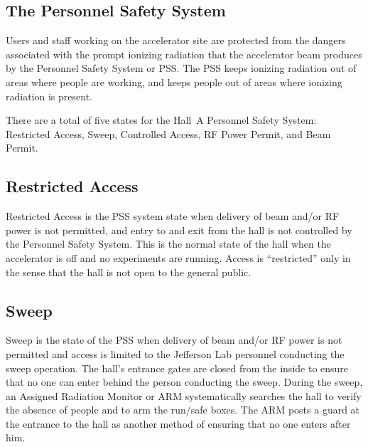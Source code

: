 \begin{safetyen}{10}{15}
\section{The Personnel Safety System} 
\end{safetyen}

 Users and staff working on the accelerator site are protected from
 the dangers associated with the prompt ionizing radiation that the
 accelerator beam produces by the Personnel Safety System or PSS.  The
 PSS keeps ionizing radiation out of areas where people are working,
 and keeps people out of areas where ionizing radiation is present.

 There are a total of five states for the Hall~A Personnel Safety
 System: Restricted Access, Sweep, Controlled Access, RF Power Permit,
 and Beam Permit.

\begin{safetyen}{10}{10}
\subsection{Restricted Access}
\end{safetyen}
 
 Restricted Access is the PSS system state when delivery of beam
 and/or RF power is not permitted, and entry to and exit from the hall
 is not controlled by the Personnel Safety System.  This is the normal
 state of the hall when the accelerator is off and no experiments are
 running.  Access is ``restricted'' only in the sense that the hall is
 not open to the general public.

\begin{safetyen}{10}{10}
\subsection{Sweep}
\end{safetyen}

Sweep is the state of the PSS when delivery of beam and/or RF power is
not permitted and access is limited to the Jefferson Lab personnel
conducting the sweep operation.  The hall's entrance gates are closed
from the inside to ensure that no one can enter behind the person
conducting the sweep. During the sweep, an Assigned Radiation Monitor
or ARM systematically searches the hall to verify the absence of
people and to arm the run/safe boxes. The ARM posts a guard at the
entrance to the hall as another method of ensuring that no one enters
after him.
 
